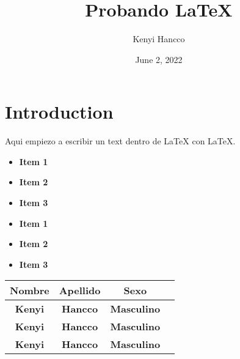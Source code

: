\documentclass{article}
\title{Probando \LaTeX}
\author{Kenyi Hancco}
\date{June 2, 2022}
\begin{document}
    \section{Introduction}
    Aqui empiezo a escribir un text dentro de LaTeX con \LaTeX. 

    \begin{itemize}
        \item \textbf{Item 1}
        \item \textbf{Item 2}
        \item \textbf{Item 3}
        
    \end{itemize}
    \begin{itemize}
        \item \textbf{Item 1}
        \item \textbf{Item 2}
        \item \textbf{Item 3}
    
    \end{itemize}

    \begin{table}[h]
        \centering
        \begin{tabular}{|c|c|c|c|}
            \hline
            \textbf{Nombre} & \textbf{Apellido} & \textbf{Sexo} \\
            \hline
            \textbf{Kenyi} & \textbf{Hancco} & \textbf{Masculino} \\
            \hline
            \textbf{Kenyi} & \textbf{Hancco} & \textbf{Masculino} \\
            \hline
            \textbf{Kenyi} & \textbf{Hancco} & \textbf{Masculino} \\
            \hline
        \end{tabular}
    \end{table}
\end{document}
